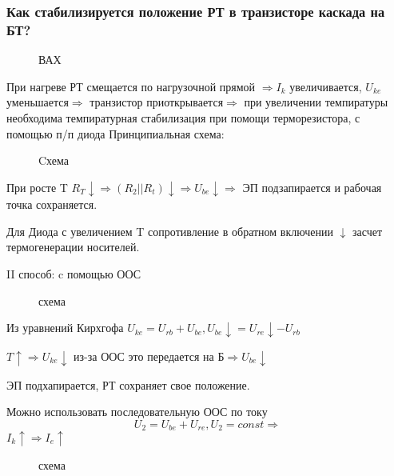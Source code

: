 
\subsubsection{Как стабилизируется положение РТ в транзисторе каскада на БТ?}
\begin{center}
	\begin{figure}[h!]
		\caption{ВАХ}	
		\label{22_VAX}
	\end{figure}
\end{center}
При нагреве РТ смещается по нагрузочной прямой $\Rightarrow I_k$ увеличивается, $U_{ke}$ уменьшается$\Rightarrow$ транзистор приоткрывается$\Rightarrow$ при увеличении темпиратуры необходима темпиратурная стабилизация при помощи терморезистора, с помощью п/п диода
Принципиальная схема:
\begin{center}
	\begin{figure}[h!]
		\caption{Cхема}	
		\label{22_Schem}
	\end{figure}
\end{center}
При росте T $R_T \downarrow\Rightarrow(R_2||R_t)\downarrow\Rightarrow U_{be}\downarrow\Rightarrow$ ЭП подзапирается и рабочая точка сохраняется.

Для Диода с увеличением T сопротивление в обратном включении $\downarrow$ засчет термогенерации носителей.

II способ: c помощью ООС
\begin{center}
	\begin{figure}[h!]
		\caption{схема}	
		\label{22_Schem_OOS}
	\end{figure}
\end{center}
Из уравнений Кирхгофа $U_{ke}=U_{rb}+U_{be},U_{be}\downarrow=U_{re}\downarrow-U_{rb}$

$T\uparrow\Rightarrow U_{ke}\downarrow$ из-за ООС это передается на Б$\Rightarrow U_{be}\downarrow$

ЭП подхапирается, РТ сохраняет свое положение.

Можно использовать последовательную ООС по току
$$
U_2=U_{be}+U_{re},
U_2=const\Rightarrow
$$
$
I_k\uparrow\Rightarrow I_e\uparrow
$
\begin{center}
	\begin{figure}[h!]
		\caption{схема}	
		\label{22_Schem_OOS_Tok}
	\end{figure}
\end{center}

